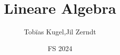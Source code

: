 \documentclass[a4paper, fontsize = 8pt, landscape]{scrartcl}
\title{Lineare Algebra}
\author{Tobïas Kugel,Jil Zerndt}
\date{FS 2024}
\begin{document}
\begin{multicols*}{3}
    \thispagestyle{TitlePageStyle}
		\maketitle
    
    \raggedcolumns
    
    \raggedcolumns
    \newpage
    
    \raggedcolumns
    
    \raggedcolumns
    
    \raggedcolumns
    
    \raggedcolumns
    \newpage
    
    \raggedcolumns  
    

\end{multicols*}
\end{document}
